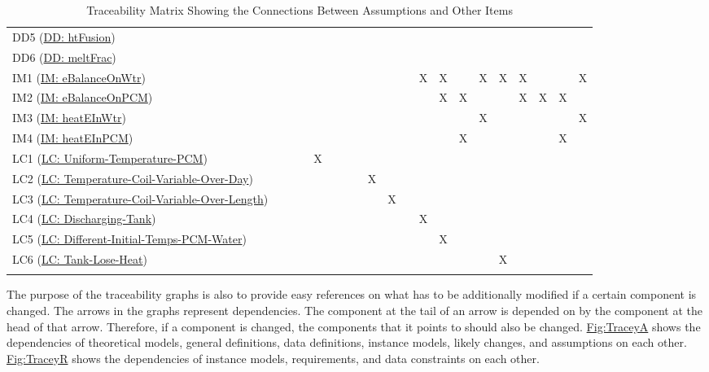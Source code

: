 \documentclass[12pt]{article}
\begin{document}
\begin{longtable}{l l l l l l l l l l l l l l l l l l l l}
\\
DD5 (\hyperref[DD:htFusion]{DD: htFusion}) &  &  &  &  &  &  &  &  &  &  &  &  &  &  &  &  &  &  & 
\\
DD6 (\hyperref[DD:meltFrac]{DD: meltFrac}) &  &  &  &  &  &  &  &  &  &  &  &  &  &  &  &  &  &  & 
\\
IM1 (\hyperref[IM:eBalanceOnWtr]{IM: eBalanceOnWtr}) &  &  &  &  &  &  &  &  &  &  & X & X &  & X & X & X &  &  & X
\\
IM2 (\hyperref[IM:eBalanceOnPCM]{IM: eBalanceOnPCM}) &  &  &  &  &  &  &  &  &  &  &  & X & X &  &  & X & X & X & 
\\
IM3 (\hyperref[IM:heatEInWtr]{IM: heatEInWtr}) &  &  &  &  &  &  &  &  &  &  &  &  &  & X &  &  &  &  & X
\\
IM4 (\hyperref[IM:heatEInPCM]{IM: heatEInPCM}) &  &  &  &  &  &  &  &  &  &  &  &  & X &  &  &  &  & X & 
\\
LC1 (\hyperref[likeChgUTP]{LC: Uniform-Temperature-PCM}) &  &  &  & X &  &  &  &  &  &  &  &  &  &  &  &  &  &  & 
\\
LC2 (\hyperref[likeChgTCVOD]{LC: Temperature-Coil-Variable-Over-Day}) &  &  &  &  &  &  &  & X &  &  &  &  &  &  &  &  &  &  & 
\\
LC3 (\hyperref[likeChgTCVOL]{LC: Temperature-Coil-Variable-Over-Length}) &  &  &  &  &  &  &  &  & X &  &  &  &  &  &  &  &  &  & 
\\
LC4 (\hyperref[likeChgDT]{LC: Discharging-Tank}) &  &  &  &  &  &  &  &  &  &  & X &  &  &  &  &  &  &  & 
\\
LC5 (\hyperref[likeChgDITPW]{LC: Different-Initial-Temps-PCM-Water}) &  &  &  &  &  &  &  &  &  &  &  & X &  &  &  &  &  &  & 
\\
LC6 (\hyperref[likeChgTLH]{LC: Tank-Lose-Heat}) &  &  &  &  &  &  &  &  &  &  &  &  &  &  & X &  &  &  & 
\\
\bottomrule
\caption{Traceability Matrix Showing the Connections Between Assumptions and Other Items}
\label{Table:Tracey3}
\end{longtable}
The purpose of the traceability graphs is also to provide easy references on what has to be additionally modified if a certain component is changed. The arrows in the graphs represent dependencies. The component at the tail of an arrow is depended on by the component at the head of that arrow. Therefore, if a component is changed, the components that it points to should also be changed. \hyperref[Figure:TraceyA]{Fig:TraceyA} shows the dependencies of theoretical models, general definitions, data definitions, instance models, likely changes, and assumptions on each other. \hyperref[Figure:TraceyR]{Fig:TraceyR} shows the dependencies of instance models, requirements, and data constraints on each other.
\end{document}
